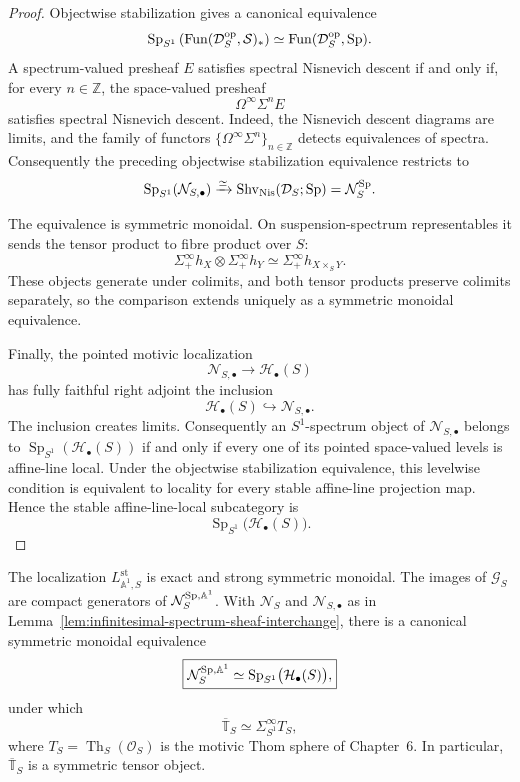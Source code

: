 \begin{proof}
Objectwise stabilization gives a canonical equivalence
\[
    \operatorname{Sp}_{S^1}
    \left(
        \operatorname{Fun}(\mathcal D_S^{\mathrm{op}},\mathcal S)_*
    \right)
    \simeq
    \operatorname{Fun}(\mathcal D_S^{\mathrm{op}},\mathrm{Sp}).
\]
A spectrum-valued presheaf $E$ satisfies spectral Nisnevich descent if and
only if, for every $n\in\mathbb Z$, the space-valued presheaf
\[
    \Omega^\infty\Sigma^nE
\]
satisfies spectral Nisnevich descent.  Indeed, the Nisnevich descent diagrams
are limits, and the family of functors
$\{\Omega^\infty\Sigma^n\}_{n\in\mathbb Z}$ detects equivalences of spectra.
Consequently the preceding objectwise stabilization equivalence restricts to
\[
    \operatorname{Sp}_{S^1}(\mathcal N_{S,\bullet})
    \xrightarrow{\simeq}
    \operatorname{Shv}_{\mathrm{Nis}}(\mathcal D_S;\mathrm{Sp})
    =
    \mathcal N_S^{\mathrm{Sp}}.
\]

The equivalence is symmetric monoidal.  On suspension-spectrum
representables it sends the tensor product to fibre product over $S$:
\[
    \Sigma^\infty_+h_X\otimes\Sigma^\infty_+h_Y
    \simeq
    \Sigma^\infty_+h_{X\times_SY}.
\]
These objects generate under colimits, and both tensor products preserve
colimits separately, so the comparison extends uniquely as a symmetric
monoidal equivalence.

Finally, the pointed motivic localization
\[
    \mathcal N_{S,\bullet}
    \longrightarrow
    \mathcal H_\bullet(S)
\]
has fully faithful right adjoint the inclusion
\[
    \mathcal H_\bullet(S)
    \hookrightarrow
    \mathcal N_{S,\bullet}.
\]
The inclusion creates limits.  Consequently an $S^1$-spectrum object of
$\mathcal N_{S,\bullet}$ belongs to
$\operatorname{Sp}_{S^1}(\mathcal H_\bullet(S))$ if and only if every one of
its pointed space-valued levels is affine-line local.  Under the objectwise
stabilization equivalence, this levelwise condition is equivalent to locality
for every stable affine-line projection map.  Hence the stable
affine-line-local subcategory is
\[
    \operatorname{Sp}_{S^1}\bigl(\mathcal H_\bullet(S)\bigr).
\]
\end{proof}

\begin{proposition}
\label{prop:infinitesimal-stable-a1-comparison}
The localization $L^{\mathrm{st}}_{\mathbb A^1,S}$ is exact and strong
symmetric monoidal.  The images of $\mathcal G_S$ are compact generators of
$\mathcal N_S^{\mathrm{Sp},\mathbb A^1}$.  With $\mathcal N_S$ and
$\mathcal N_{S,\bullet}$ as in
Lemma~\ref{lem:infinitesimal-spectrum-sheaf-interchange}, there is a canonical
symmetric monoidal equivalence
\[
    \boxed{
    \mathcal N_S^{\mathrm{Sp},\mathbb A^1}
    \simeq
    \operatorname{Sp}_{S^1}\bigl(\mathcal H_\bullet(S)\bigr),
    }
\]
under which
\[
    \overline{\mathbb T}_S
    \simeq
    \Sigma^\infty_{S^1}T_S,
\]
where $T_S=\operatorname{Th}_S(\mathcal O_S)$ is the motivic Thom sphere of
Chapter~6.  In particular, $\overline{\mathbb T}_S$ is a symmetric tensor
object.
\end{proposition}

